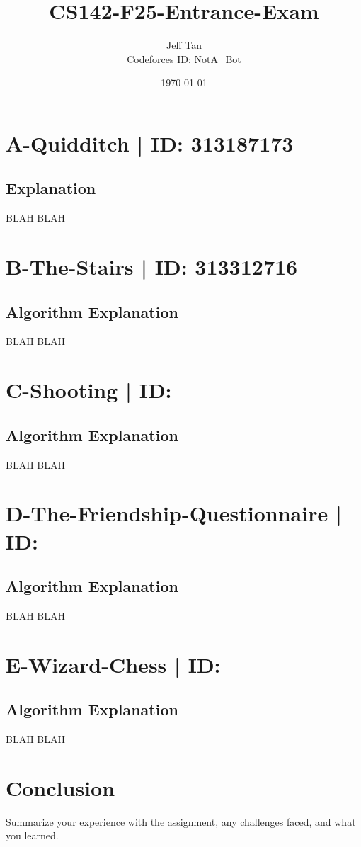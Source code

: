 \documentclass[12pt]{article}
\title{CS142-F25-Entrance-Exam}
\author{Jeff Tan \\ Codeforces ID: NotA\_Bot}
\date{\today}
\begin{document}
\maketitle


\section*{A-Quidditch | ID: 313187173}
\subsection*{Explanation}
BLAH BLAH


\section*{B-The-Stairs | ID: 313312716}
\subsection*{Algorithm Explanation}
BLAH BLAH

\section*{C-Shooting | ID: }
\subsection*{Algorithm Explanation}
BLAH BLAH

\section*{D-The-Friendship-Questionnaire | ID: }
\subsection*{Algorithm Explanation}
BLAH BLAH

\section*{E-Wizard-Chess | ID: }
\subsection*{Algorithm Explanation}
BLAH BLAH



\section*{Conclusion}
Summarize your experience with the assignment, any challenges faced, and what you learned.
\end{document}
